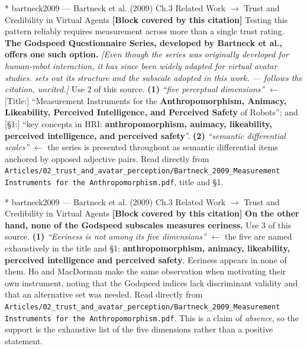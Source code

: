 \documentclass[11pt, a4paper]{article}
\makeatletter
\newcounter{citentry}
\newcommand{\citentry@core}[7]{%
  \stepcounter{citentry}
  \begingroup
  \sbox{\citentry@measurebox}{%
    \begin{minipage}{\linewidth}
      \noindent\colorbox{konstanzblue}{\parbox{\dimexpr\linewidth-2\fboxsep}{%
        \vspace{3pt}
        \textbf{\#\thecitentry \quad #2} \hfill \textit{#3}
        \vspace{3pt}
      }}
      \vspace{3pt}
      \noindent\begin{tabular}{@{}p{2.7cm} p{\dimexpr\linewidth-3cm}@{}}
        \textit{\small Sentence in thesis:} & #4 \\[5pt]
        \textbf{Usage:}\hfill       & #5 \\[5pt]
        \textit{\small Original source:}     & #6 \\[5pt]
        \textbf{How to check:}             & #7 \\
      \end{tabular}
      \vspace{5pt}
      \rule{10pt}{10pt}\quad \textbf{Validated} --- I have read the original and agree it supports the sentence.
    \end{minipage}%
  }%
  \Needspace{\dimexpr\ht\citentry@measurebox+\dp\citentry@measurebox\relax}%
  \endgroup
  \vspace{10pt}
  \noindent\colorbox{konstanzblue}{\parbox{\dimexpr\linewidth-2\fboxsep}{%
    \vspace{3pt}
    \textcolor{white}{\textbf{\#\thecitentry \quad #2}} \hfill \textcolor{white}{\textit{#3}}
    \vspace{3pt}
  }}
  \vspace{3pt}
  \noindent\begin{tabular}{@{}p{2.7cm} p{\dimexpr\linewidth-3cm}@{}}
    \textit{\small Sentence in thesis:} & \textcolor{darkgreen}{#4} \\[5pt]
    \textbf{Usage:}\hfill       & #5 \\[5pt]
    \textit{\small Original source:}     & \textcolor{darkred}{#6} \\[5pt]
    \textbf{How to check:}             & #7 \\
  \end{tabular}
  \vspace{5pt}
  \noindent\CheckBox[name=verified\thecitentry, width=10pt, height=10pt, bordercolor={0 0 0}, borderwidth=0.75, backgroundcolor={1 1 1}#1]{}\quad \textbf{Validated} --- I have read the original and agree it supports the sentence.
  \vspace{3pt}
  \noindent\textcolor{midgray}{\rule{\linewidth}{0.4pt}}
}
\newcommand{\citentry}{\@ifstar{\citentry@core{, checked}}{\citentry@core{}}}
\makeatother
\begin{document}
\begin{Form}
\citentry*
  {bartneck2009 --- Bartneck et al. (2009)}
  {Ch.3 Related Work $\rightarrow$ Trust and Credibility in Virtual Agents}
  {\textbf{[Block covered by this citation]} Testing this pattern reliably requires measurement across more than a single trust rating. \textbf{The Godspeed Questionnaire Series, developed by Bartneck et al., offers one such option.} \emph{[Even though the series was originally developed for human-robot interaction, it has since been widely adapted for virtual avatar studies. sets out its structure and the subscale adopted in this work. --- follows the citation, uncited.]}}
  {Use 2 of this source.}
  {\textbf{(1)} \emph{``five perceptual dimensions''} $\leftarrow$ [Title:] ``Measurement Instruments for the \textbf{Anthropomorphism, Animacy, Likeability, Perceived Intelligence, and Perceived Safety} of Robots''; and [\S1:] ``key concepts in HRI: \textbf{anthropomorphism, animacy, likeability, perceived intelligence, and perceived safety}''. \quad \textbf{(2)} \emph{``semantic differential scales''} $\leftarrow$ the series is presented throughout as semantic differential items anchored by opposed adjective pairs.}
  {Read directly from \texttt{\footnotesize Articles/02\_trust\_and\_avatar\_perception/Bartneck\_2009\_Measurement Instruments for the Anthropomorphism.pdf}, title and \S1.}

\citentry*
  {bartneck2009 --- Bartneck et al. (2009)}
  {Ch.3 Related Work $\rightarrow$ Trust and Credibility in Virtual Agents}
  {\textbf{[Block covered by this citation]} \textbf{On the other hand, none of the Godspeed subscales measures eeriness.}}
  {Use 3 of this source.}
  {\textbf{(1)} \emph{``Eeriness is not among its five dimensions''} $\leftarrow$ the five are named exhaustively in the title and \S1: \textbf{anthropomorphism, animacy, likeability, perceived intelligence and perceived safety}. Eeriness appears in none of them. Ho and MacDorman make the same observation when motivating their own instrument, noting that the Godspeed indices lack discriminant validity and that an alternative set was needed.}
  {Read directly from \texttt{\footnotesize Articles/02\_trust\_and\_avatar\_perception/Bartneck\_2009\_Measurement Instruments for the Anthropomorphism.pdf}. This is a claim of \emph{absence}, so the support is the exhaustive list of the five dimensions rather than a positive statement.}


\end{Form}
\end{document}
